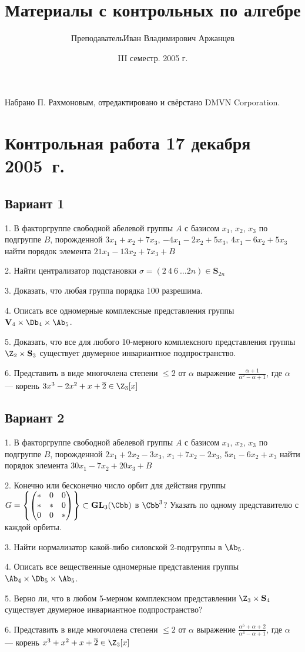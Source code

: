 \documentclass[a4paper]{article}
\title{Материалы с контрольных по алгебре}
\author{Преподаватель\т Иван Владимирович Аржанцев}
\date{III семестр. 2005 г.}
\begin{document}
\maketitle
\centerline{\small Набрано П. Рахмоновым, отредактировано и свёрстано DMVN Corporation.}

\medskip
\dmvntrail

\section{Контрольная работа 17 декабря 2005~г.}

\subsection{Вариант 1}

1. В факторгруппе свободной абелевой группы $A$ с базисом $x_1$,
$x_2$, $x_3$ по подгруппе $B$, порожденной $3x_1+x_2+7x_3$,
$-4x_1-2x_2+5x_3$, $4x_1-6x_2+5x_3$ найти порядок элемента
$21x_1-13x_2+7x_3+B$

2. Найти централизатор подстановки $\sigma =(2\ 4\ 6\ \ldots
2n)\in \mathbf{S}_{2n}$

3. Доказать, что любая группа порядка 100 разрешима.

4. Описать все одномерные комплексные представления группы
$\mathbf{V}_4\times \Db_4\times \Ab_5$.

5. Доказать, что все для любого 10-мерного комплексного
представления группы $\Z_2\times \mathbf{S}_3$ существует
двумерное инвариантное подпространство.

6. Представить в виде многочлена степени $\leq 2$ от $\alpha $
выражение $\frac{\alpha +1}{\alpha^2 -\alpha +1}$, где $\alpha$
--- корень $3x^3-2x^2+x+\overline{2}\in \Z_3[x]$


\subsection{Вариант 2}

1. В факторгруппе свободной абелевой группы $A$ с базисом $x_1$,
$x_2$, $x_3$ по подгруппе $B$, порожденной $2x_1+2x_2-3x_3$,
$x_1+7x_2-2x_3$, $5x_1-6x_2+x_3$ найти порядок элемента
$30x_1-7x_2+20x_3+B$

2. Конечно или бесконечно число орбит для действия группы
$
G=\left\{
\begin{pmatrix}
* & 0 & 0 \\
* & * & 0 \\
0 & 0 & *
\end{pmatrix}
\right\} \subset \mathbf{GL}_3(\Cbb ) $ в $\Cbb^3$? Указать по
одному представителю с каждой орбиты.

3. Найти нормализатор какой-либо силовской 2-подгруппы в
$\Ab_5$.

4. Описать все вещественные одномерные представления группы
$\Ab_4\times \Db_5\times \Ab_5$.

5. Верно ли, что в любом 5-мерном комплексном представлении
$\Z_3\times \mathbf{S}_4$ существует двумерное
инвариантное подпространство?

6. Представить в виде многочлена степени $\leq 2$ от $\alpha $
выражение $\frac{\alpha^5 + \alpha +2}{\alpha^4 -\alpha +1}$, где
$\alpha$ --- корень $x^3+x^2+x+\overline{2}\in \Z_3[x]$
\end{document}
